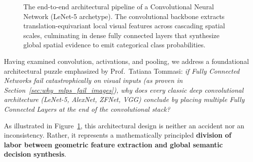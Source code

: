 \begin{figure}[H]
\caption{The end-to-end architectural pipeline of a Convolutional Neural Network (LeNet-5 archetype). The convolutional backbone extracts translation-equivariant local visual features across cascading spatial scales, culminating in dense fully connected layers that synthesize global spatial evidence to emit categorical class probabilities.}
\label{fig:end_to_end_cnn_pipeline}
\end{figure}

Having examined convolution, activations, and pooling, we address a foundational architectural puzzle emphasized by Prof.~Tatiana Tommasi: \textit{if Fully Connected Networks fail catastrophically on visual inputs (as proven in Section~\ref{sec:why_mlps_fail_images}), why does every classic deep convolutional architecture (LeNet-5, AlexNet, ZFNet, VGG) conclude by placing multiple Fully Connected Layers at the end of the convolutional stack?}

As illustrated in Figure~\ref{fig:end_to_end_cnn_pipeline}, this architectural design is neither an accident nor an inconsistency. Rather, it represents a mathematically principled \textbf{division of labor between geometric feature extraction and global semantic decision synthesis}.

